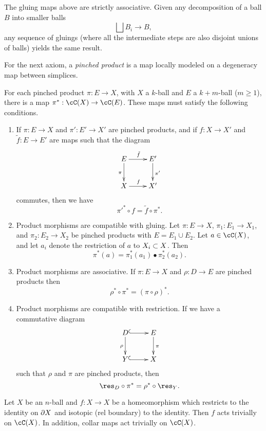 \documentclass{pnastwo}
\begin{document}
\begin{article}
\begin{axiom} \label{nca-assoc}
The gluing maps above are strictly associative.
Given any decomposition of a ball $B$ into smaller balls
$$\bigsqcup B_i \to B,$$ 
any sequence of gluings (where all the intermediate steps are also disjoint unions of balls) yields the same result.
\end{axiom}
For the next axiom, a \emph{pinched product} is a map locally modeled on a degeneracy map between simplices.
\begin{axiom}
\label{axiom:product}
For each pinched product $\pi:E\to X$, with $X$ a $k$-ball and $E$ a $k{+}m$-ball ($m\ge 1$),
there is a map $\pi^*:\cC(X)\to \cC(E)$.
These maps must satisfy the following conditions.
\begin{enumerate}
\item
If $\pi:E\to X$ and $\pi':E'\to X'$ are pinched products, and
if $f:X\to X'$ and $\tilde{f}:E \to E'$ are maps such that the diagram
\[ \xymatrix{
	E \ar[r]^{\tilde{f}} \ar[d]_{\pi} & E' \ar[d]^{\pi'} \\
	X \ar[r]^{f} & X'
} \]
commutes, then we have 
\[
	\pi'^*\circ f = \tilde{f}\circ \pi^*.
\]
\item
Product morphisms are compatible with gluing.
Let $\pi:E\to X$, $\pi_1:E_1\to X_1$, and $\pi_2:E_2\to X_2$ 
be pinched products with $E = E_1\cup E_2$.
Let $a\in \cC(X)$, and let $a_i$ denote the restriction of $a$ to $X_i\subset X$.
Then 
\[
	\pi^*(a) = \pi_1^*(a_1)\bullet \pi_2^*(a_2) .
\]
\item
Product morphisms are associative.
If $\pi:E\to X$ and $\rho:D\to E$ are pinched products then
\[
	\rho^*\circ\pi^* = (\pi\circ\rho)^* .
\]
\item
Product morphisms are compatible with restriction.
If we have a commutative diagram
\[ \xymatrix{
	D \ar@{^(->}[r] \ar[d]_{\rho} & E \ar[d]^{\pi} \\
	Y \ar@{^(->}[r] & X
} \]
such that $\rho$ and $\pi$ are pinched products, then
\[
	\res_D\circ\pi^* = \rho^*\circ\res_Y .
\]
\end{enumerate}
\end{axiom}
\begin{axiom}
\label{axiom:extended-isotopies}
Let $X$ be an $n$-ball and $f: X\to X$ be a homeomorphism which restricts
to the identity on $\partial X$ and isotopic (rel boundary) to the identity.
Then $f$ acts trivially on $\cC(X)$.
In addition, collar maps act trivially on $\cC(X)$.
\end{axiom}


\end{article}
\end{document}
